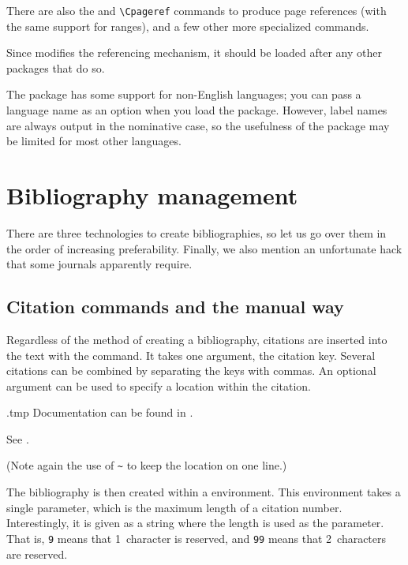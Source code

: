 There are also the  and \verb|\Cpageref|
commands to produce page references (with the same support for ranges),
and a few other more specialized commands.

\begin{gotcha}
Since  modifies the referencing mechanism,
it should be loaded after any other packages that do so.
\end{gotcha}

\begin{gotcha}
The  package has some support for non-English languages;
you can pass a language name as an option when you load the package.
However, label names are always output in the nominative case,
so the usefulness of the package may be limited for most other languages.
\end{gotcha}



%
%
%
\section{Bibliography management}\label{sec:bibliography}

There are three technologies to create bibliographies,
so let us go over them in the order of increasing preferability.
Finally, we also mention an unfortunate hack that some journals apparently require.

%
\subsection{Citation commands and the manual way}

Regardless of the method of creating a bibliography,
citations are inserted into the text with the  command.
It takes one argument, the citation key.
Several citations can be combined by separating the keys with commas.
An optional argument can be used to specify a location within the citation.

\begin{VerbatimOut}{\jobname.tmp}
Documentation can be found in
\cite{TLC, tikz}.

See \cite[Chapter~8]{TLC}.
\end{VerbatimOut}
\ShowExample
(Note again the use of \verb|~| to keep the location on one line.)


The bibliography is then created within a  environment.
This environment takes a single parameter,
which is the maximum length of a citation number.
Interestingly, it is given as a string where the length is used as the parameter.
That is, \verb|9| means that 1~character is reserved,
and \verb|99| means that 2~characters are reserved.


